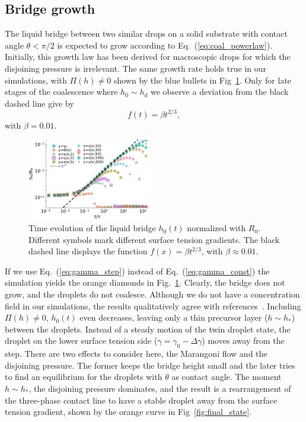 \documentclass[twocolumn,amsmath,amssymb,showpacs,nofootinbib,prfluids,superscriptaddress]{revtex4-2} %
\begin{document}
\subsection{Bridge growth}\label{subsec:growth}
The liquid bridge between two similar drops on a solid substrate with contact angle $\theta < \pi/2$ is expected to grow according to Eq.~(\ref{eq:coal_powerlaw}). 
Initially, this growth law has been derived for macroscopic drops for which the disjoining pressure is irrelevant.
The same growth rate holds true in our simulations, with $\Pi(h) \neq 0$ shown by the blue bullets in Fig~\ref{fig:bridge_growth}.
Only for late stages of the coalescence where $h_0 \sim h_d$ we observe a deviation from the black dashed line give by
\begin{equation}\label{eq:fit_powerlaw}
    f(t) = \beta t^{2/3},
\end{equation}
with $\beta = 0.01$.
\begin{figure}
    \centering
    \includegraphics[width=0.48\textwidth]{Figures/bridge_evo_all_2.pdf}
    \caption{Time evolution of the liquid bridge $h_0(t)$ normalized with $R_0$. 
    Different symbols mark different surface tension gradients.
    The black dashed line displays the function $f(x) = \beta t^{2/3}$, with $\beta \approx 0.01$.}
    \label{fig:bridge_growth}
\end{figure} 

If we use Eq.~(\ref{eq:gamma_step}) instead of Eq.~(\ref{eq:gamma_const}) the simulation yields the orange diamonds in Fig.~\ref{fig:bridge_growth}.
Clearly, the bridge does not grow, and the droplets do not coalesce.
Although we do not have a concentration field in our simulations, the results qualitatively agree with references~\cite{karpitschka2014sharp, doi:10.1021/la500459v, PhysRevLett.109.066103, doi:10.1021/la800630w}. 
Including $\Pi(h) \neq 0$, $h_0(t)$ even decreases, leaving only a thin precursor layer ($h\sim h_{\ast}$) between the droplets.
Instead of a steady motion of the twin droplet state, the droplet on the lower surface tension side ($\gamma = \gamma_0 - \Delta\gamma$) moves away from the step.
There are two effects to consider here, the Marangoni flow and the disjoining pressure.
The former keeps the bridge height small and the later tries to find an equilibrium for the droplets with $\theta$ as contact angle.
The moment $h\sim h_{\ast}$, the disjoining pressure dominates, and the result is a rearrangement of the three-phase contact line to have a stable droplet away from the surface tension gradient, shown by the orange curve in Fig~\ref{fig:final_state}.
\end{document}
